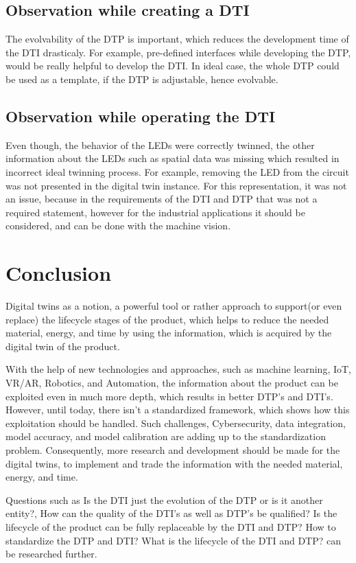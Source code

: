 \documentclass[conference]{IEEEtran}
\begin{document}
    \subsection{Observation while creating a DTI}

    The evolvability of the DTP is important, which reduces the development time of the DTI drasticaly. For example, pre-defined interfaces while developing the DTP, would be really helpful to develop the DTI. In ideal case, the whole DTP could be used as a template, if the DTP is adjustable, hence evolvable. 

    \subsection{Observation while operating the DTI}

    Even though, the behavior of the LEDs were correctly twinned, the other information about the LEDs such as spatial data was missing which resulted in incorrect ideal twinning process. For example, removing the LED from the circuit was not presented in the digital twin instance. For this representation, it was not an issue, because in the requirements of the DTI and DTP that was not a required statement, however for the industrial applications it should be considered, and can be done with the machine vision. 

    \section{Conclusion}

    Digital twins as a notion, a powerful tool or rather approach to support(or even replace) the lifecycle stages of the product, which helps to reduce the needed material, energy, and time by using the information, which is acquired by the digital twin of the product. 

    With the help of new technologies and approaches, such as machine learning, IoT, VR/AR, Robotics, and Automation,  the information about the product can be exploited even in much more depth, which results in better DTP's and DTI's. However, until today, there isn't a standardized framework, which shows how this exploitation should be handled. Such challenges, Cybersecurity, data integration, model accuracy, and model calibration are adding up to the standardization problem. Consequently, more research and development should be made for the digital twins, to implement and trade the information with the needed material, energy, and time. 

    Questions such as Is the DTI just the evolution of the DTP or is it another entity?, How can the quality of the DTI's as well as DTP's be qualified? Is the lifecycle of the product can be fully replaceable by the DTI and DTP? How to standardize the DTP and DTI? What is the lifecycle of the DTI and DTP?  can be researched further.
    
    
    
\end{document}
